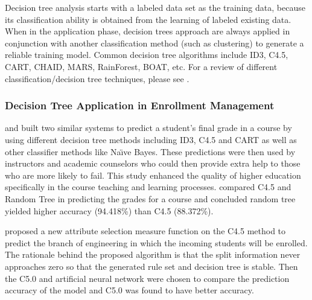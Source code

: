 \documentclass[12pt,english]{report}
\begin{document}

Decision tree analysis starts with a labeled data set as the training data, because its classification ability is obtained from the learning of labeled existing data. When in the application phase, decision trees approach are always applied in conjunction with another classification method (such as clustering) to generate a reliable training model.
 Common decision tree algorithms include ID3, C4.5, CART, CHAID, MARS, RainForest, BOAT, etc.  
For a review of different classification/decision tree techniques, please see \citep{dt_review}.

\subsubsection{Decision Tree Application in Enrollment Management}

\citet{dt_performance} and \citet{dt_performance1} built two similar systems to predict a student's final grade in a course by using different decision tree methods including ID3, C4.5 and CART as well as other classifier methods like Na{\"\i}ve Bayes. These  predictions were then used by instructors and academic counselors who could then provide extra help to those who are more likely to fail. This study enhanced the quality of higher education specifically in the course teaching and learning processes. \citet{dt_performance2} compared C4.5 and Random Tree in predicting the grades for a course and concluded random tree yielded higher accuracy (94.418\%) than C4.5 (88.372\%).

\citet{dt_enroll_india} proposed a new attribute selection measure function on the C4.5 method to predict the branch of engineering in which the incoming students will be enrolled. The rationale behind the proposed algorithm is that the split information never approaches zero so that the generated rule set and decision tree is stable. Then the C5.0 and artificial neural network were chosen to compare the prediction accuracy of the model and C5.0 was found to have better accuracy.
\end{document}
